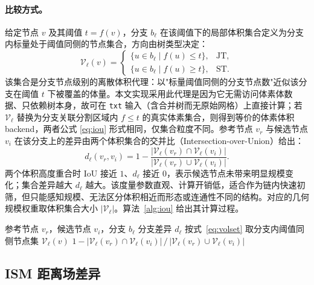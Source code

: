 \documentclass[twocolumn, a4paper, 10pt]{article}
\begin{document}
\paragraph{比较方式。}给定节点 $v$ 及其阈值 $t=f(v)$，分支 $b_\ell$ 在该阈值下的局部体积集合定义为分支内标量处于阈值同侧的节点集合，方向由树类型决定：
\begin{equation}
\mathcal{V}_\ell(v)=
\begin{cases}
\{u\in b_\ell\mid f(u)\leq t\}, & \mathrm{JT},\\
\{u\in b_\ell\mid f(u)\geq t\}, & \mathrm{ST}.
\end{cases}
\label{eq:volset}
\end{equation}
该集合是分支节点级别的离散体积代理：以"标量阈值同侧的分支节点数"近似该分支在阈值 $t$ 下被覆盖的体量。本文实现采用此代理是因为它无需访问体素体数据、只依赖树本身，故可在 \texttt{txt} 输入（含合并树而无原始网格）上直接计算；若 $\mathcal{V}_\ell$ 替换为分支关联分割区域内 $f\leq t$ 的真实体素集合，则得到等价的体素体积 backend，两者公式 \eqref{eq:iou} 形式相同，仅集合粒度不同。参考节点 $v_r$ 与候选节点 $v_i$ 在该分支上的差异由两个体积集合的交并比（Intersection-over-Union）给出：
\begin{equation}
d_\ell(v_r,v_i)=1-\frac{|\mathcal{V}_\ell(v_r)\cap \mathcal{V}_\ell(v_i)|}{|\mathcal{V}_\ell(v_r)\cup \mathcal{V}_\ell(v_i)|}.
\label{eq:iou}
\end{equation}
两个体积高度重合时 IoU 接近 $1$、$d_\ell$ 接近 $0$，表示候选节点未带来明显规模变化；集合差异越大 $d_\ell$ 越大。该度量参数直观、计算开销低，适合作为链内快速初筛，但只能感知规模、无法区分体积相近而形态或连通性不同的结构。对应的几何规模权重取体积集合大小 $|\mathcal{V}_\ell|$。算法~\ref{alg:iou} 给出其计算过程。

\begin{algorithm}[H]
\caption{\textsc{BranchDiff} 的 IoU 实例}
\label{alg:iou}
\begin{algorithmic}[1]
\Require 参考节点 $v_r$，候选节点 $v_i$，分支 $b_\ell$
\Ensure 分支差异 $d_\ell$
    \State 按式~\eqref{eq:volset} 取分支内阈值同侧节点集 $\mathcal{V}_\ell(v)$
  \EndFor
  \State \Return $1-|\mathcal{V}_\ell(v_r)\cap\mathcal{V}_\ell(v_i)|\,/\,|\mathcal{V}_\ell(v_r)\cup\mathcal{V}_\ell(v_i)|$
\EndFunction
\end{algorithmic}
\end{algorithm}

\subsection{ISM 距离场差异}
\label{sec:ism}
\end{document}
